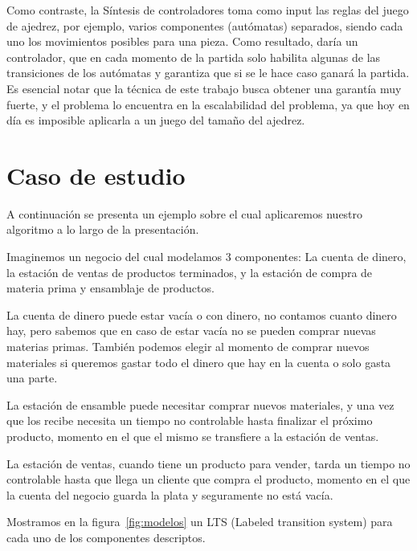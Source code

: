 Como contraste, la Síntesis de controladores toma como input las reglas del juego de ajedrez, por ejemplo, varios componentes (autómatas) separados, siendo cada uno los movimientos posibles para una pieza. Como resultado, daría un controlador, que en cada momento de la partida solo habilita algunas de las transiciones de los autómatas y garantiza que si se le hace caso ganará la partida. Es esencial notar que la técnica de este trabajo busca obtener una garantía muy fuerte, y el problema lo encuentra en la escalabilidad del problema, ya que hoy en día es imposible aplicarla a un juego del tamaño del ajedrez.

\section{Caso de estudio}
A continuación se presenta un ejemplo sobre el cual aplicaremos nuestro algoritmo a lo largo de la presentación. 

Imaginemos un negocio del cual modelamos 3 componentes: La cuenta de dinero, la estación de ventas de productos terminados, y la estación de compra de materia prima y ensamblaje de productos.

La cuenta de dinero puede estar vacía o con dinero, no contamos cuanto dinero hay, pero sabemos que en caso de estar vacía no se pueden comprar nuevas materias primas. También podemos elegir al momento de comprar nuevos materiales si queremos gastar todo el dinero que hay en la cuenta o solo gasta una parte.

La estación de ensamble puede necesitar comprar nuevos materiales, y una vez que los recibe necesita un tiempo no controlable hasta finalizar el próximo producto, momento en el que el mismo se transfiere a la estación de ventas.

La estación de ventas, cuando tiene un producto para vender, tarda un tiempo no controlable hasta que llega un cliente que compra el producto, momento en el que la cuenta del negocio guarda la plata y seguramente no está vacía.

Mostramos en la figura~\ref{fig:modelos} un LTS (Labeled transition system) para cada uno de los componentes descriptos.


